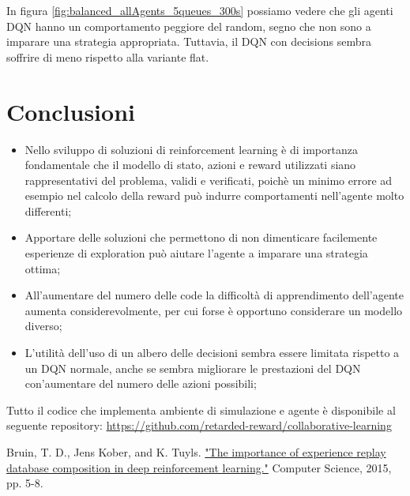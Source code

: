 \documentclass[conference]{IEEEtran}
\begin{document}
In figura \autoref{fig:balanced_allAgents_5queues_300s} possiamo vedere che gli agenti 
DQN hanno un comportamento peggiore del random, segno che non sono a imparare una 
strategia appropriata. Tuttavia, il DQN con decisions sembra soffrire di meno rispetto
alla variante flat.

\section{Conclusioni}
\begin{itemize}
    \item Nello sviluppo di soluzioni di reinforcement learning è di importanza fondamentale
    che il modello di stato, azioni e reward utilizzati siano rappresentativi del 
    problema, validi e verificati, poichè un minimo errore ad esempio nel calcolo della
    reward può indurre comportamenti nell'agente molto differenti;
    \item Apportare delle soluzioni che permettono di non dimenticare facilemente
    esperienze di exploration può aiutare l'agente a imparare una strategia ottima;
    \item All'aumentare del numero delle code la difficoltà di apprendimento dell'agente
    aumenta considerevolmente, per cui forse è opportuno considerare un modello diverso;
    \item L'utilità dell'uso di un albero delle decisioni sembra essere limitata
    rispetto a un DQN normale, anche se sembra migliorare le prestazioni del DQN
    con'aumentare del numero delle azioni possibili;
\end{itemize}

Tutto il codice che implementa ambiente di simulazione e agente è disponibile al 
seguente repository: \href{https://github.com/retarded-reward/collaborative-learning}{https://github.com/retarded-reward/collaborative-learning}

\begin{thebibliography}{00}
     Bruin, T. D., Jens Kober, and K. Tuyls. \href{https://rll.berkeley.edu/deeprlworkshop/papers/database_composition.pdf}{"The importance of experience replay database composition in deep reinforcement learning."} Computer Science, 2015, pp. 5-8.
\end{thebibliography}

\end{document}

